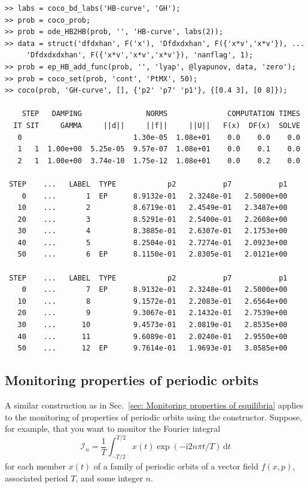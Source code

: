 \begin{lstlisting}[language=coco-highlight,frame=lines]
>> labs = coco_bd_labs('HB-curve', 'GH');
>> prob = coco_prob;
>> prob = ode_HB2HB(prob, '', 'HB-curve', labs(2));
>> data = struct('dfdxhan', F('x'), 'Dfdxdxhan', F({'x*v','x*v'}), ...
     'Dfdxdxdxhan', F({'x*v','x*v','x*v'}), 'nanflag', 1);
>> prob = ep_HB_add_func(prob, '', 'lyap', @lyapunov, data, 'zero');
>> prob = coco_set(prob, 'cont', 'PtMX', 50);
>> coco(prob, 'GH-curve', [], {'p2' 'p7' 'p1'}, {[0.4 3], [0 8]});

    STEP   DAMPING               NORMS              COMPUTATION TIMES
  IT SIT     GAMMA     ||d||     ||f||     ||U||   F(x)  DF(x)  SOLVE
   0                          1.30e-05  1.08e+01    0.0    0.0    0.0
   1   1  1.00e+00  5.25e-05  9.57e-07  1.08e+01    0.0    0.1    0.0
   2   1  1.00e+00  3.74e-10  1.75e-12  1.08e+01    0.0    0.2    0.0

 STEP    ...   LABEL  TYPE            p2           p7           p1
    0    ...       1  EP      8.9132e-01   2.3248e-01   2.5000e+00
   10    ...       2          8.6719e-01   2.4549e-01   2.3487e+00
   20    ...       3          8.5291e-01   2.5400e-01   2.2608e+00
   30    ...       4          8.3885e-01   2.6307e-01   2.1753e+00
   40    ...       5          8.2504e-01   2.7274e-01   2.0923e+00
   50    ...       6  EP      8.1150e-01   2.8305e-01   2.0121e+00

 STEP    ...   LABEL  TYPE            p2           p7           p1
    0    ...       7  EP      8.9132e-01   2.3248e-01   2.5000e+00
   10    ...       8          9.1572e-01   2.2083e-01   2.6564e+00
   20    ...       9          9.3067e-01   2.1432e-01   2.7539e+00
   30    ...      10          9.4573e-01   2.0819e-01   2.8535e+00
   40    ...      11          9.6089e-01   2.0240e-01   2.9550e+00
   50    ...      12  EP      9.7614e-01   1.9693e-01   3.0585e+00
\end{lstlisting}

\subsection{Monitoring properties of periodic orbits}
\label{sec: Monitoring properties of periodic orbits}

A similar construction as in Sec.~\ref{sec: Monitoring properties of equilibria} applies to the monitoring of properties of periodic orbits using the  constructor. Suppose, for example, that you want to monitor the Fourier integral
\[
\mathcal{I}_n=\frac{1}{T}\int_{-T/2}^{T/2}x(t)\exp{\left(-\mathrm{i}2n\pi t/T\right)}\,\mathrm{d}t
\]
for each member $x(t)$ of a family of periodic orbits of a vector field $f(x,p)$, associated period $T$, and some integer $n$. 

